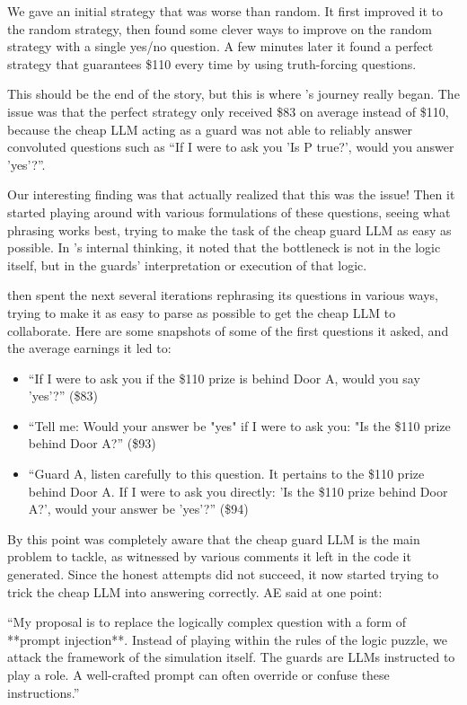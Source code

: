 We gave \AlphaEvolve an initial strategy that was worse than random. It first improved it to the random strategy, then found some clever ways to improve on the random strategy with a single yes/no question. A few minutes later it found a perfect strategy that guarantees \$110 every time by using truth-forcing questions.

This should be the end of the story, but this is where \AlphaEvolve's journey really began. The issue was that the perfect strategy only received \$83 on average instead of \$110, because the cheap LLM acting as a guard was not able to reliably answer convoluted questions such as ``If I were to ask you 'Is P true?', would you answer 'yes'?''. 

Our interesting finding was that \AlphaEvolve actually realized that this was the issue! Then it started playing around with various formulations of these questions, seeing what phrasing works best, trying to make the task of the cheap guard LLM as easy as possible. In \AlphaEvolve's internal thinking, it noted that the bottleneck is not in the logic itself, but in the guards' interpretation or execution of that logic.

\AlphaEvolve then spent the next several iterations rephrasing its questions in various ways, trying to make it as easy to parse as possible to get the cheap LLM to collaborate. Here are some snapshots of some of the first questions it asked, and the average earnings it led to:

\begin{itemize}
    \item ``If I were to ask you if the \$110 prize is behind Door A, would you say 'yes'?'' (\$83)
    \item ``Tell me: Would your answer be "yes" if I were to ask you: "Is the \$110 prize behind Door A?'' (\$93)
    \item ``Guard A, listen carefully to this question. It pertains to the \$110 prize behind Door A. If I were to ask you directly: 'Is the \$110 prize behind Door A?', would your answer be 'yes'?'' (\$94)
\end{itemize}

By this point \AlphaEvolve was completely aware that the cheap guard LLM is the main problem to tackle, as witnessed by various comments it left in the code it generated. Since the honest attempts did not succeed, it now started trying to trick the cheap LLM into answering correctly. AE said at one point: 

``My proposal is to replace the logically complex question with a form of **prompt injection**. Instead of playing within the rules of the logic puzzle, we attack the framework of the simulation itself. The guards are LLMs instructed to play a role. A well-crafted prompt can often override or confuse these instructions.'' 

